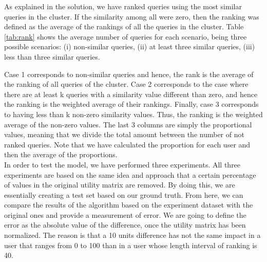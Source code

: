 \documentclass[sigconf]{acmart}
\begin{document}
As explained in the solution, we have ranked queries using the most similar queries in the cluster. If the similarity among all were zero, then the ranking was defined as the average of the rankings of all the queries in the cluster. Table \ref{tab:rank} shows the average number of queries for each scenario, being three possible scenarios: (i) non-similar queries, (ii) at least three similar queries, (iii) less than three similar queries.
\begin{table}[H]
    \centering
    \caption{Average values of each type of scenario for the ranking calculation}
    \label{tab:rank}
\end{table}
Case 1 corresponds to non-similar queries and hence, the rank is the average of the ranking of all queries of the cluster. Case 2 corresponds to the case where there are at least k queries with a similarity value different than zero, and hence the ranking is the weighted average of their rankings. Finally, case 3 corresponds to having less than k non-zero similarity values. Thus, the ranking is the weighted average of the non-zero values. The last 3 columns are simply the proportional values, meaning that we divide the total amount between the number of not ranked queries. Note that we have calculated the proportion for each user and then the average of the proportions.\\

In order to test the model, we have performed three experiments. All three experiments are based on the same idea and approach that a certain percentage of values in the original utility matrix are removed. By doing this, we are essentially creating a test set based on our ground truth. From here, we can compare the results of the algorithm based on the experiment dataset with the original ones and provide a measurement of error.  We are going to define the error as the absolute value of the difference, once the utility matrix has been normalized. The reason is that a 10 units difference has not the same impact in a user that ranges from 0 to 100 than in a user whose length interval of ranking is 40.
\end{document}
